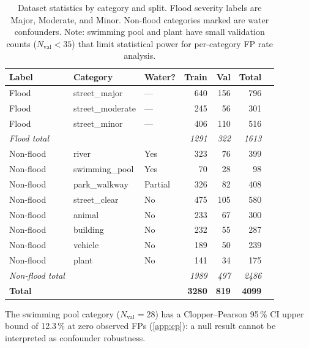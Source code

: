 \documentclass[a4paper,fleqn]{cas-sc}
\newcommand{\CP}{Clopper--Pearson\xspace}
\begin{document}
\begin{table}
  \centering
  \caption{Dataset statistics by category and split.
           Flood severity labels are Major, Moderate, and Minor.
           Non-flood categories marked \dag{} are water confounders.
           Note: swimming pool and plant have small validation counts
           ($N_\text{val} < 35$) that limit statistical power for
           per-category FP rate analysis.}
  \label{tab:dataset}
  \small
  \begin{tabular}{lllrrrr}
    \toprule
    \textbf{Label} & \textbf{Category} & \textbf{Water?} &
    \textbf{Train} & \textbf{Val} & \textbf{Total} \\
    \midrule
    Flood & street\_major     & ---   & 640  & 156 & 796  \\
    Flood & street\_moderate  & ---   & 245  &  56 & 301  \\
    Flood & street\_minor     & ---   & 406  & 110 & 516  \\
    \textit{Flood total} & & & \textit{1291} & \textit{322} & \textit{1613} \\
    \midrule
    Non-flood & river\dag{}         & Yes & 323 &  76 & 399 \\
    Non-flood & swimming\_pool\dag{} & Yes &  70 &  28 &  98 \\
    Non-flood & park\_walkway\dag{}  & Partial & 326 &  82 & 408 \\
    Non-flood & street\_clear       & No  & 475 & 105 & 580 \\
    Non-flood & animal              & No  & 233 &  67 & 300 \\
    Non-flood & building            & No  & 232 &  55 & 287 \\
    Non-flood & vehicle             & No  & 189 &  50 & 239 \\
    Non-flood & plant               & No  & 141 &  34 & 175 \\
    \textit{Non-flood total} & & & \textit{1989} & \textit{497} & \textit{2486} \\
    \midrule
    \textbf{Total} & & & \textbf{3280} & \textbf{819} & \textbf{4099} \\
    \bottomrule
  \end{tabular}
\end{table}

The swimming pool category ($N_\text{val} = 28$) has a \CP{} 95\,\% CI upper bound of 12.3\,\%
at zero observed FPs (\cref{app:cp}): a null result cannot be interpreted as confounder robustness.
\end{document}
